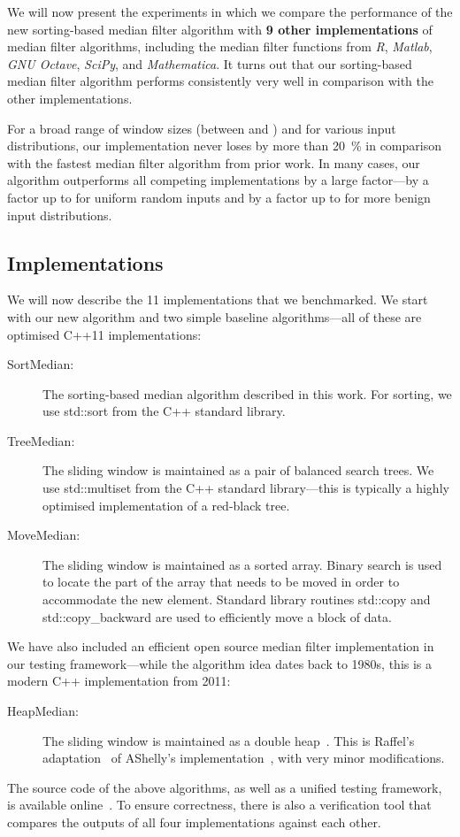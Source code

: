 \documentclass[a4paper,11pt]{article}
\begin{document}
We will now present the experiments in which we compare the performance of the new sorting-based median filter algorithm with \textbf{9 other implementations} of median filter algorithms, including the median filter functions from \emph{R}, \emph{Matlab}, \emph{GNU Octave}, \emph{SciPy}, and \emph{Mathematica}. It turns out that our sorting-based median filter algorithm performs consistently very well in comparison with the other implementations.

For a broad range of window sizes (between  and ) and for various input distributions, our implementation never loses by more than 20~\% in comparison with the fastest median filter algorithm from prior work. In many cases, our algorithm outperforms all competing implementations by a large factor---by a factor up to  for uniform random inputs and by a factor up to  for more benign input distributions.


\subsection{Implementations}\label{ssec:impl}

We will now describe the 11 implementations that we benchmarked. We start with our new algorithm and two simple baseline algorithms---all of these are optimised C++11 implementations:
\begin{description}
    \item[SortMedian:] The sorting-based median algorithm described in this work. For sorting, we use std::sort from the C++ standard library.
    \item[TreeMedian:] The sliding window is maintained as a pair of balanced search trees. We use std::multiset from the C++ standard library---this is typically a highly optimised implementation of a red-black tree.
    \item[MoveMedian:] The sliding window is maintained as a sorted array. Binary search is used to locate the part of the array that needs to be moved in order to accommodate the new element. Standard library routines std::copy and std::copy\_backward are used to efficiently move a block of data.
\end{description}
We have also included an efficient open source median filter implementation in our testing framework---while the algorithm idea dates back to 1980s, this is a modern C++ implementation from 2011:
\begin{description}
    \item[HeapMedian:] The sliding window is maintained as a double heap~\cite{astola89median,juhola91comparison,hardle95median-smooth}. This is Raffel's adaptation~ of AShelly's implementation~, with very minor modifications.
\end{description}
The source code of the above algorithms, as well as a unified testing framework, is available online~. To ensure correctness, there is also a verification tool that compares the outputs of all four implementations against each other.
\end{document}
